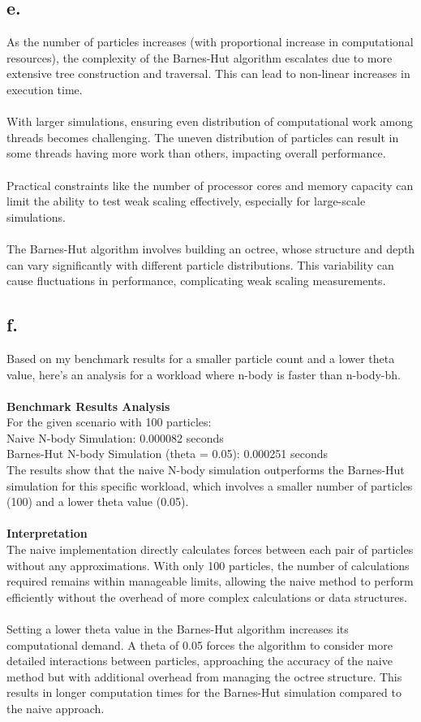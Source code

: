 \documentclass{article}
\begin{document}
\subsection*{e.}
As the number of particles increases (with proportional increase in computational resources), the complexity of the Barnes-Hut algorithm escalates due to more extensive tree construction and traversal. This can lead to non-linear increases in execution time.
\\
\\
With larger simulations, ensuring even distribution of computational work among threads becomes challenging. The uneven distribution of particles can result in some threads having more work than others, impacting overall performance.
\\
\\
Practical constraints like the number of processor cores and memory capacity can limit the ability to test weak scaling effectively, especially for large-scale simulations.
\\
\\
The Barnes-Hut algorithm involves building an octree, whose structure and depth can vary significantly with different particle distributions. This variability can cause fluctuations in performance, complicating weak scaling measurements.

\subsection*{f.}
Based on my benchmark results for a smaller particle count and a lower theta value, here's an analysis for a workload where n-body is faster than n-body-bh.
\\
\\
\textbf{Benchmark Results Analysis}
\\
For the given scenario with 100 particles:
\\
Naive N-body Simulation: 0.000082 seconds
\\
Barnes-Hut N-body Simulation (theta = 0.05): 0.000251 seconds
\\
The results show that the naive N-body simulation outperforms the Barnes-Hut simulation for this specific workload, which involves a smaller number of particles (100) and a lower theta value (0.05).
\\
\\
\textbf{Interpretation}
\\
The naive implementation directly calculates forces between each pair of particles without any approximations. With only 100 particles, the number of calculations required remains within manageable limits, allowing the naive method to perform efficiently without the overhead of more complex calculations or data structures.
\\
\\
Setting a lower theta value in the Barnes-Hut algorithm increases its computational demand. A theta of 0.05 forces the algorithm to consider more detailed interactions between particles, approaching the accuracy of the naive method but with additional overhead from managing the octree structure. This results in longer computation times for the Barnes-Hut simulation compared to the naive approach.
\end{document}
